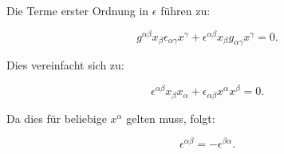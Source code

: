 Die Terme erster Ordnung in $\epsilon$ führen zu:

\[
g^{\alpha \beta} x_\beta \epsilon_{\alpha \gamma} x^\gamma + \epsilon^{\alpha \beta} x_\beta g_{\alpha \gamma} x^\gamma = 0.
\]

Dies vereinfacht sich zu:

\[
\epsilon^{\alpha \beta} x_\beta x_\alpha + \epsilon_{\alpha \beta} x^\alpha x^\beta = 0.
\]

Da dies für beliebige $x^\alpha$ gelten muss, folgt:

\[
\epsilon^{\alpha \beta} = -\epsilon^{\beta \alpha}.
\]

